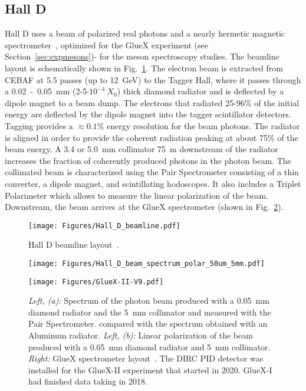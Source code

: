 \subsection{Hall D}
\label{sec:app-halld}

Hall D uses a beam of polarized real photons and a nearly hermetic magnetic spectrometer~\cite{Adhikari:2020cvz}, optimized for the GlueX experiment (see Section~\ref{sec:expmesons})- for the meson spectroscopy studies. The beamline layout is schematically shown in Fig.~\ref{fig:halld_beamline}.
The electron beam is extracted from CEBAF at 5.5 passes (up to 12~GeV) to the Tagger Hall, where it passes through a 0.02~-~0.05~mm (2-5$\cdot{}10^{-4}~X_0$) thick diamond radiator and is deflected by a dipole magnet to a beam dump. The electrons that radiated 25-96\% of the initial energy are deflected by the dipole magnet into the tagger scintillator detectors. Tagging provides a ${\approx}0.1\%$ energy resolution for the beam photons. 
The radiator is aligned in order to provide the coherent radiation peaking at about 75\% of the beam energy. A 3.4 or 5.0~mm collimator 75~m downstream of the radiator increases the fraction of coherently produced photons in the photon beam. The collimated beam is characterized using the Pair Spectrometer consisting of a thin converter, a dipole magnet, and scintillating hodoscopes. It also includes a Triplet Polarimeter which allows to measure the linear polarization of the beam. Downstream, the beam arrives at the GlueX spectrometer (shown in Fig.~\ref{fig:halld_spectrometer}).

\begin{figure}[!htb]
\centering
  \texttt{[image: Figures/Hall\_D\_beamline.pdf]}%
  \caption[Hall D beamline]{Hall D beamline layout~\cite{Adhikari:2020cvz}. 
    \label{fig:halld_beamline}
  }
\end{figure}

\begin{figure}[!htb]
  \begin{minipage}[]{0.36\linewidth}
    \texttt{[image: Figures/Hall\_D\_beam\_spectrum\_polar\_50um\_5mm.pdf]}
  \end{minipage}
  \begin{minipage}[]{0.63\linewidth}
    \texttt{[image: Figures/GlueX-II-V9.pdf]}%
  \end{minipage}
  \caption{{\it Left, (a):} Spectrum of the photon beam produced with a 0.05~mm diamond radiator and the 5~mm collimator and measured with the Pair Spectrometer. compared with the spectrum obtained with an Aluminum radiator. 
  {\it Left, (b):} Linear polarization of the beam produced with a 0.05~mm diamond radiator and 5~mm collimator.
  {\it Right:} GlueX spectrometer layout~\cite{Adhikari:2020cvz}. The DIRC PID detector was installed for the GlueX-II experiment that started in 2020. GlueX-I had finished data taking in 2018.
    \label{fig:halld_spectrometer}
  }
\end{figure}

